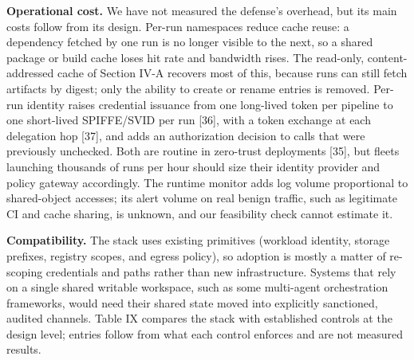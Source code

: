 \documentclass[conference]{IEEEtran}
\begin{document}
\textbf{Operational cost.} We have not measured the defense's overhead, but its main costs follow from its design. Per-run namespaces reduce cache reuse: a dependency fetched by one run is no longer visible to the next, so a shared package or build cache loses hit rate and bandwidth rises. The read-only, content-addressed cache of Section IV-A recovers most of this, because runs can still fetch artifacts by digest; only the ability to create or rename entries is removed. Per-run identity raises credential issuance from one long-lived token per pipeline to one short-lived SPIFFE/\allowbreak SVID per run [36], with a token exchange at each delegation hop [37], and adds an authorization decision to calls that were previously unchecked. Both are routine in zero-trust deployments [35], but fleets launching thousands of runs per hour should size their identity provider and policy gateway accordingly. The runtime monitor adds log volume proportional to shared-object accesses; its alert volume on real benign traffic, such as legitimate CI and cache sharing, is unknown, and our feasibility check cannot estimate it.

\textbf{Compatibility.} The stack uses existing primitives (workload identity, storage prefixes, registry scopes, and egress policy), so adoption is mostly a matter of re-scoping credentials and paths rather than new infrastructure. Systems that rely on a single shared writable workspace, such as some multi-agent orchestration frameworks, would need their shared state moved into explicitly sanctioned, audited channels. Table IX compares the stack with established controls at the design level; entries follow from what each control enforces and are not measured results.
\end{document}
